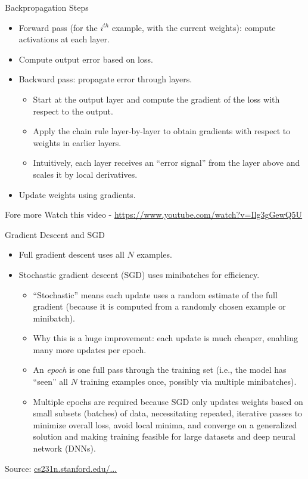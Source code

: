 \documentclass[10pt]{beamer}
\begin{document}
\begin{frame}{Backpropagation Steps}
  \justifying
  \begin{itemize}
    \item Forward pass (for the $i^{th}$ example, with the current weights): compute activations at each layer.
    \item Compute output error based on loss.
    \item Backward pass: propagate error through layers.
      \begin{itemize}
        \item Start at the output layer and compute the gradient of the loss with respect to the output.
        \item Apply the chain rule layer-by-layer to obtain gradients with respect to weights in earlier layers.
        \item Intuitively, each layer receives an ``error signal'' from the layer above and scales it by local derivatives.
      \end{itemize}
    \item Update weights using gradients.
  \end{itemize}
\begin{warningbox}{Fore more}
  Watch this video - \href{https://www.youtube.com/watch?v=Ilg3gGewQ5U}{https://www.youtube.com/watch?v=Ilg3gGewQ5U}
  \end{warningbox}
\end{frame}

\begin{frame}{Gradient Descent and SGD}
  \justifying
  \begin{itemize}
    \item Full gradient descent uses all $N$ examples.
    \item Stochastic gradient descent (SGD) uses minibatches for efficiency.
    \begin{itemize}
      \item ``Stochastic'' means each update uses a random estimate of the full gradient (because it is computed from a randomly chosen example or minibatch).
      \item Why this is a huge improvement: each update is much cheaper, enabling many more updates per epoch.
      \item An \emph{epoch} is one full pass through the training set (i.e., the model has ``seen'' all $N$ training examples once, possibly via multiple minibatches).
      \item Multiple epochs are required because SGD only updates weights based on small subsets (batches) of data, necessitating repeated, iterative passes to minimize overall loss, avoid local minima, and converge on a generalized solution and making training feasible for large datasets and deep neural network (DNNs).
    \end{itemize}
  \end{itemize}
  \vspace{0.5em}
  \footnotesize
  Source: \href{https://cs231n.stanford.edu/slides/2025/lecture_4.pdf}{cs231n.stanford.edu/...}
\end{frame}
\end{document}

